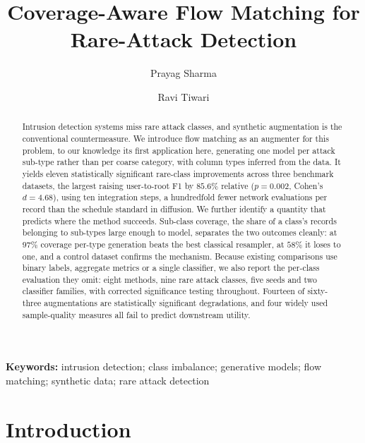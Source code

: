 \documentclass[11pt]{article}
\begin{document}
\title{\textbf{Coverage-Aware Flow Matching for Rare-Attack Detection}}

\author[1]{Prayag Sharma}
\author[2]{Ravi Tiwari}

\date{}
\maketitle

\begin{abstract}
Intrusion detection systems miss rare attack classes, and synthetic
augmentation is the conventional countermeasure. We introduce flow matching as an augmenter for
this problem, to our knowledge its first application here, generating one model per
attack sub-type rather than per coarse category, with column types inferred from the
data. It yields eleven statistically significant rare-class improvements across three
benchmark datasets, the largest raising user-to-root F1 by $85.6\%$ relative
($p=0.002$, Cohen's $d=4.68$), using ten integration steps, a hundredfold fewer
network evaluations per record than the schedule standard in diffusion. We further
identify a quantity that predicts where the method succeeds. Sub-class coverage, the
share of a class's records belonging to sub-types large enough to model, separates
the two outcomes cleanly: at $97\%$ coverage per-type generation beats the best
classical resampler, at $58\%$ it loses to one, and a control dataset confirms the mechanism. Because existing comparisons use binary
labels, aggregate metrics or a single classifier, we also report the per-class
evaluation they omit: eight methods, nine rare attack classes, five seeds and two
classifier families, with corrected significance testing throughout. Fourteen of sixty-three augmentations are statistically
significant degradations, and four widely used sample-quality measures all fail to
predict downstream utility.
\end{abstract}

\noindent\textbf{Keywords:} intrusion detection; class imbalance; generative models;
flow matching; synthetic data; rare attack detection

\section*{Introduction}
\end{document}

